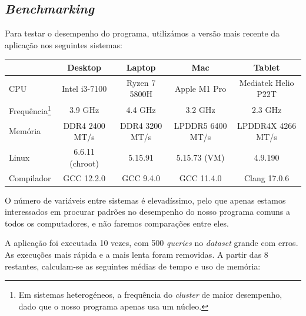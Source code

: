 \documentclass[11pt, a4paper]{article}
\begin{document}
\subsection{\emph{Benchmarking}}
\label{sec:benchmarking}

Para testar o desempenho do programa, utilizámos a versão mais recente da aplicação nos seguintes
sistemas:

\begin{adjustwidth}{-1.5cm}{-1.5cm}
    \begin{center}
        \begin{tabular}{|l|c|c|c|c|}
            \hline
            & Desktop & Laptop & Mac & Tablet \\
            \hline
            CPU & Intel i3-7100 & Ryzen 7 5800H & Apple M1 Pro & Mediatek Helio P22T \\
            \hline
            Frequência\footnote{Em sistemas heterogéneos, a frequência do \emph{cluster} de maior
                                desempenho, dado que o nosso programa apenas usa um núcleo.} &
            3.9 GHz & 4.4 GHz & 3.2 GHz & 2.3 GHz \\
            \hline
            Memória & DDR4 2400 MT/s & DDR4 3200 MT/s & LPDDR5 6400 MT/s & LPDDR4X 4266 MT/s \\
            \hline
            Linux & 6.6.11 (chroot) & 5.15.91 & 5.15.73 (VM) & 4.9.190 \\
            \hline
            Compilador & GCC 12.2.0 & GCC 9.4.0 & GCC 11.4.0 & Clang 17.0.6 \\
            \hline
        \end{tabular}
    \end{center}
\end{adjustwidth}

O número de variáveis entre sistemas é elevadíssimo, pelo que apenas estamos interessados em
procurar padrões no desempenho do nosso programa comuns a todos os computadores, e não faremos
comparações entre eles.

A aplicação foi executada 10 vezes, com 500 \emph{queries} no \emph{dataset} grande com erros. As
execuções mais rápida e a mais lenta foram removidas. A partir das 8 restantes, calculam-se as
seguintes médias de tempo e uso de memória:
\end{document}
